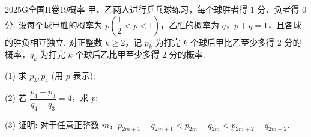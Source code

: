 
\begin{problem}{2025}{G}{全国II卷}{19}{概率}
甲、乙两人进行乒乓球练习，每个球胜者得 1 分、负者得 0 分. 设每个球甲胜的概率为 $p \left(\dfrac{1}{2}<p<1\right)$，乙胜的概率为 $q$，$p+q=1$，且各球的胜负相互独立. 对正整数 $k \geqslant 2$，记 $p_k$ 为打完 $k$ 个球后甲比乙至少多得 2 分的概率，$q_k$ 为打完 $k$ 个球后乙比甲至少多得 2 分的概率.

(1) 求 $p_3, p_4$ (用 $p$ 表示);

(2) 若 $\dfrac{p_4-p_3}{q_4-q_3}=4$，求 $p$;

(3) 证明: 对于任意正整数 $m$，$p_{2m+1}-q_{2m+1} < p_{2m}-q_{2m} < p_{2m+2}-q_{2m+2}$.
\end{problem}

